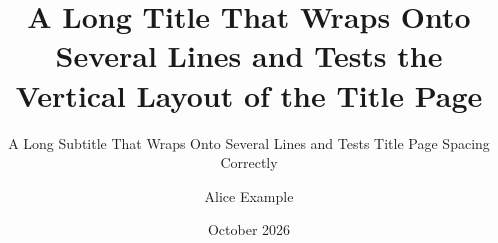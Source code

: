 \documentclass[11pt]{beamer}
\title{A Long Title That Wraps Onto Several Lines and Tests the Vertical Layout of the Title Page}
\subtitle{A Long Subtitle That Wraps Onto Several Lines and Tests Title Page Spacing Correctly}
\author{Alice Example}
\institute{Example University}
\date{October 2026}
\begin{document}
\begin{frame}[plain]\titlepage\end{frame}
\end{document}
